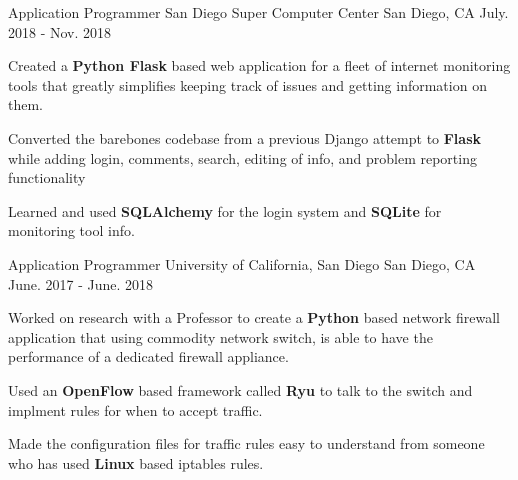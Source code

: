 

\begin{cventries}

  \cventry
    {Application Programmer} %
    {San Diego Super Computer Center} %
    {San Diego, CA} %
    {July. 2018 - Nov. 2018} %
    {
      \begin{cvitems} %
        \item {Created a \textbf{Python Flask} based web application for a fleet of internet monitoring tools that greatly simplifies keeping track of issues and getting information on them.}
        \item {Converted the barebones codebase from a previous Django attempt to \textbf{Flask} while adding login, comments, search, editing of info, and problem reporting functionality}
        \item {Learned and used \textbf{SQLAlchemy} for the login system and \textbf{SQLite} for monitoring tool info.}
      \end{cvitems}
    }

  \cventry
    {Application Programmer} %
    {University of California, San Diego} %
    {San Diego, CA} %
    {June. 2017 - June. 2018} %
    {
      \begin{cvitems} %
        \item {Worked on research with a Professor to create a \textbf{Python} based network firewall application that using  commodity network switch, is able to have the performance of a dedicated firewall appliance.}
        \item {Used an \textbf{OpenFlow} based framework called \textbf{Ryu} to talk to the switch and implment rules for when to accept traffic.}
        \item {Made the configuration files for traffic rules easy to understand from someone who has used \textbf{Linux} based iptables rules.}
      \end{cvitems}
    }


\end{cventries}
